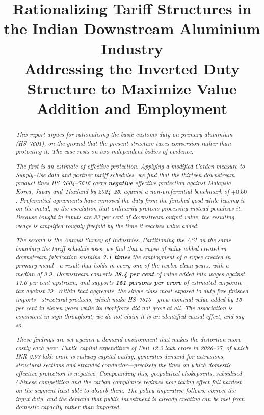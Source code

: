 \documentclass[11pt, a4paper]{article}
\title{\textbf{Rationalizing Tariff Structures in the Indian Downstream Aluminium Industry}\\
\Large Addressing the Inverted Duty Structure to Maximize Value Addition and Employment}
\author{}
\date{}
\numberwithin{figure}{section}
\numberwithin{table}{section}
\begin{document}
\maketitle

\begin{abstract}
\noindent \textit{This report argues for rationalising the basic customs duty on
primary aluminium (HS~7601), on the ground that the present structure taxes conversion
rather than protecting it. The case rests on two independent bodies of evidence.}

\smallskip
\noindent \textit{The first is an estimate of effective protection. Applying a modified
Corden measure to Supply--Use data and partner tariff schedules, we find that the thirteen
downstream product lines HS~7604--7616 carry \textbf{negative} effective protection against
Malaysia, Korea, Japan and Thailand by 2024--25, against a non-preferential benchmark of
$+0.50$. Preferential agreements have removed the duty from the finished good while leaving
it on the metal, so the escalation that ordinarily protects processing instead penalises it.
Because bought-in inputs are 83 per cent of downstream output value, the resulting wedge is
amplified roughly fivefold by the time it reaches value added.}

\smallskip
\noindent \textit{The second is the Annual Survey of Industries. Partitioning the ASI on the
same boundary the tariff schedule uses, we find that a rupee of value added created in
downstream fabrication sustains \textbf{3.1 times} the employment of a rupee created in
primary metal---a result that holds in every one of the twelve clean years, with a median of
3.9. Downstream converts \textbf{38.4 per cent} of value added into wages against 17.6 per
cent upstream, and supports \textbf{151 persons per crore} of estimated corporate tax against
39. Within that aggregate, the single class most exposed to duty-free finished
imports---structural products, which make HS~7610---grew nominal value added by 15 per
cent in eleven years while its workforce did not grow at all. The association is consistent in sign
throughout; we do not claim it is an identified causal effect, and say so.}

\smallskip
\noindent \textit{These findings are set against a demand environment that makes the
distortion more costly each year. Public capital expenditure of INR 12.2 lakh crore in
2026--27, of which INR 2.93 lakh crore is railway capital outlay, generates demand for
extrusions, structural sections and stranded conductor---precisely the lines on which
domestic effective protection is negative. Compounding this, geopolitical chokepoints,
subsidised Chinese competition and the carbon-compliance regimes now taking effect fall
hardest on the segment least able to absorb them. The policy imperative follows: correct the
input duty, and the demand that public investment is already creating can be met from
domestic capacity rather than imported.}
\end{abstract}
\end{document}
